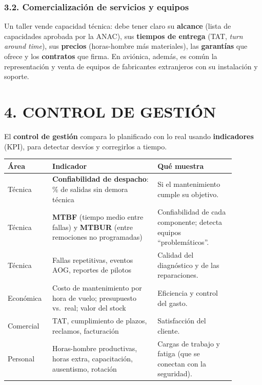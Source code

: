 \subsubsection*{3.2. Comercialización de servicios y equipos}
Un taller vende capacidad técnica: debe tener claro su \textbf{alcance} (lista de capacidades
aprobada por la ANAC), sus \textbf{tiempos de entrega} (TAT, \textit{turn around time}), sus
\textbf{precios} (horas-hombre más materiales), las \textbf{garantías} que ofrece y los
\textbf{contratos} que firma. En aviónica, además, es común la representación y venta de equipos de
fabricantes extranjeros con su instalación y soporte.

\section*{4. CONTROL DE GESTIÓN}

El \textbf{control de gestión} compara lo planificado con lo real usando \textbf{indicadores}
(KPI), para detectar desvíos y corregirlos a tiempo.

\begin{center}
\small
\begin{tabular}{|p{0.15\linewidth}|p{0.42\linewidth}|p{0.31\linewidth}|}
\hline
\textbf{Área} & \textbf{Indicador} & \textbf{Qué muestra} \\ \hline
Técnica & \textbf{Confiabilidad de despacho}: \% de salidas sin demora técnica & Si el
mantenimiento cumple su objetivo. \\ \hline
Técnica & \textbf{MTBF} (tiempo medio entre fallas) y \textbf{MTBUR} (entre remociones no
programadas) & Confiabilidad de cada componente; detecta equipos ``problemáticos''. \\ \hline
Técnica & Fallas repetitivas, eventos AOG, reportes de pilotos & Calidad del diagnóstico y
de las reparaciones. \\ \hline
Económica & Costo de mantenimiento por hora de vuelo; presupuesto vs.\ real; valor del stock &
Eficiencia y control del gasto. \\ \hline
Comercial & TAT, cumplimiento de plazos, reclamos, facturación & Satisfacción del cliente. \\
\hline
Personal & Horas-hombre productivas, horas extra, capacitación, ausentismo, rotación &
Cargas de trabajo y fatiga (que se conectan con la seguridad). \\ \hline
\end{tabular}
\end{center}

